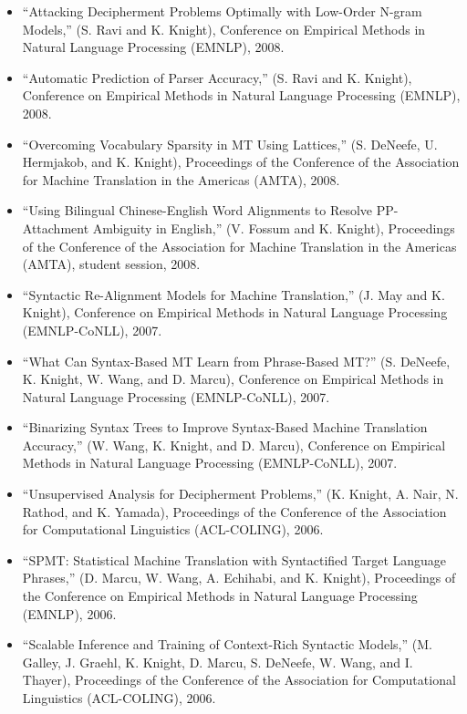 \begin{itemize}
\item ``Attacking Decipherment Problems Optimally with Low-Order 
N-gram Models,'' (S. Ravi and K. Knight), 
Conference on Empirical Methods in Natural Language Processing (EMNLP), 
2008. 

\item ``Automatic Prediction of Parser Accuracy,'' (S. Ravi and K. Knight), 
Conference on Empirical Methods in Natural Language Processing (EMNLP), 
2008. 

\item ``Overcoming Vocabulary Sparsity in MT Using Lattices,'' 
(S. DeNeefe, U. Hermjakob, and K. Knight), 
Proceedings of the Conference of the Association for Machine
Translation in the Americas (AMTA), 
2008. 

\item ``Using Bilingual Chinese-English Word Alignments to 
Resolve PP-Attachment Ambiguity in English,'' (V. Fossum and K. Knight), 
Proceedings of the Conference of the Association for Machine
Translation in the Americas (AMTA), 
student session, 2008.

\item ``Syntactic Re-Alignment Models for Machine Translation,''
(J. May and K. Knight), 
Conference on Empirical Methods in Natural Language Processing (EMNLP-CoNLL), 
2007.

\item ``What Can Syntax-Based MT Learn from Phrase-Based MT?''
(S. DeNeefe, K. Knight, W. Wang, and D. Marcu),
Conference on Empirical Methods in Natural Language Processing (EMNLP-CoNLL), 
2007.

\item ``Binarizing Syntax Trees to Improve Syntax-Based Machine
Translation Accuracy,'' (W. Wang, K. Knight, and D. Marcu),
Conference on Empirical Methods in Natural Language Processing (EMNLP-CoNLL), 
2007.

\item ``Unsupervised Analysis for Decipherment Problems,'' (K. Knight,
A. Nair, N. Rathod, and K. Yamada), 
Proceedings of the Conference of the 
Association for Computational Linguistics (ACL-COLING), 
2006.

\item ``SPMT: Statistical Machine Translation with Syntactified Target Language Phrases,'' (D. Marcu, W. Wang, A. Echihabi, and K. Knight), 
Proceedings of the Conference on
Empirical Methods in Natural Language Processing (EMNLP), 2006.

\item ``Scalable Inference and Training of Context-Rich Syntactic Models,'' 
(M. Galley, J. Graehl, K. Knight, D. Marcu, S. DeNeefe, W. Wang, 
and I. Thayer), 
Proceedings of the Conference of the 
Association for Computational Linguistics (ACL-COLING), 
2006.


\end{itemize}
